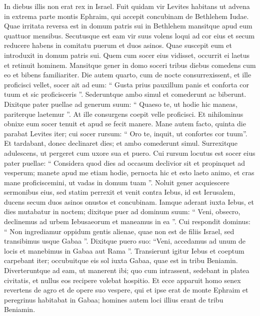 \begin{biblechapter}
\begin{biblechapter}
\begin{biblechapter}
\begin{biblechapter}
\begin{biblechapter}
\begin{biblechapter}
\begin{biblechapter}
\begin{biblechapter}
\begin{biblechapter}
\begin{biblechapter}
\begin{biblechapter}
\begin{biblechapter}
\begin{biblechapter}
\begin{biblechapter}
\begin{biblechapter}
\begin{biblechapter}
\begin{biblechapter}
\begin{biblechapter}
\begin{biblechapter}
 In diebus illis non erat rex in Israel. 
\verse Fuit quidam vir Levites habitans ut advena in extrema parte montis Ephraim, qui accepit concubinam de Bethlehem Iudae. 
\verse Quae irritata reversa est in domum patris sui in Bethlehem mansitque apud eum quattuor mensibus. 
\verse Secutusque est eam vir suus volens loqui ad cor eius et secum reducere habens in comitatu puerum et duos asinos. Quae suscepit eum et introduxit in domum patris sui. Quem cum socer eius vidisset, occurrit ei laetus 
\verse et retinuit hominem. Mansitque gener in domo soceri tribus diebus comedens cum eo et bibens familiariter. 
\verse Die autem quarto, cum de nocte consurrexissent, et ille proficisci vellet, socer ait ad eum: “ Gusta prius pauxillum panis et conforta cor tuum et sic proficisceris ”. 
\verse Sederuntque ambo simul et comederunt ac biberunt. Dixitque pater puellae ad generum suum: “ Quaeso te, ut hodie hic maneas, pariterque laetemur ”. 
\verse At ille consurgens coepit velle proficisci. Et nihilominus obnixe eum socer tenuit et apud se fecit manere. 
\verse Mane autem facto, quinta die parabat Levites iter; cui socer rursum: “ Oro te, inquit, ut confortes cor tuum”. Et tardabant, donec declinaret dies; et ambo comederunt simul. 
\verse Surrexitque adulescens, ut pergeret cum uxore sua et puero. Cui rursum locutus est socer eius pater puellae: “ Considera quod dies ad occasum declivior sit et propinquet ad vesperum; manete apud me etiam hodie, pernocta hic et esto laeto animo, et cras mane proficiscemini, ut vadas in domum tuam ”.
 \verse Noluit gener acquiescere sermonibus eius, sed statim perrexit et venit contra Iebus, id est Ierusalem, ducens secum duos asinos onustos et concubinam. 
\verse Iamque aderant iuxta Iebus, et dies mutabatur in noctem; dixitque puer ad dominum suum: “ Veni, obsecro, declinemus ad urbem Iebusaeorum et maneamus in ea ”. 
\verse Cui respondit dominus: “ Non ingrediamur oppidum gentis alienae, quae non est de filiis Israel, sed transibimus usque Gabaa ”. 
\verse Dixitque puero suo: “Veni, accedamus ad unum de locis et manebimus in Gabaa aut Rama ”.
 \verse Transierunt igitur Iebus et coeptum carpebant iter; occubuitque eis sol iuxta Gabaa, quae est in tribu Beniamin. 
\verse Diverteruntque ad eam, ut manerent ibi; quo cum intrassent, sedebant in platea civitatis, et nullus eos recipere volebat hospitio. 
\verse Et ecce apparuit homo senex revertens de agro et de opere suo vespere, qui et ipse erat de monte Ephraim et peregrinus habitabat in Gabaa; homines autem loci illius erant de tribu Beniamin. 

\end{biblechapter}
\end{biblechapter}
\end{biblechapter}
\end{biblechapter}
\end{biblechapter}
\end{biblechapter}
\end{biblechapter}
\end{biblechapter}
\end{biblechapter}
\end{biblechapter}
\end{biblechapter}
\end{biblechapter}
\end{biblechapter}
\end{biblechapter}
\end{biblechapter}
\end{biblechapter}
\end{biblechapter}
\end{biblechapter}
\end{biblechapter}
